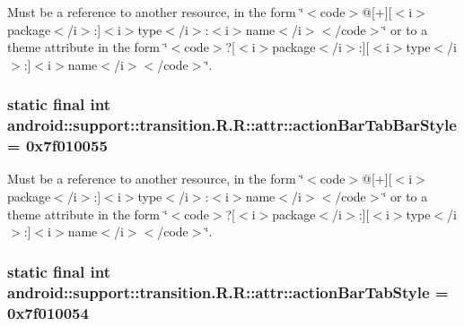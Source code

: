 Must be a reference to another resource, in the form \char`\"{}$<$code$>$@\mbox{[}+\mbox{]}\mbox{[}$<$i$>$package$<$/i$>$:\mbox{]}$<$i$>$type$<$/i$>$:$<$i$>$name$<$/i$>$$<$/code$>$\char`\"{} or to a theme attribute in the form \char`\"{}$<$code$>$?\mbox{[}$<$i$>$package$<$/i$>$:\mbox{]}\mbox{[}$<$i$>$type$<$/i$>$:\mbox{]}$<$i$>$name$<$/i$>$$<$/code$>$\char`\"{}. \hypertarget{classandroid_1_1support_1_1transition_1_1_r_1_1attr_6341d6c682dd48d3ac25faf8b4751851}{
\subsubsection[{actionBarTabBarStyle}]{\setlength{\rightskip}{0pt plus 5cm}static final int android::support::transition.R.R::attr::actionBarTabBarStyle = 0x7f010055}}
\label{classandroid_1_1support_1_1transition_1_1_r_1_1attr_6341d6c682dd48d3ac25faf8b4751851}


Must be a reference to another resource, in the form \char`\"{}$<$code$>$@\mbox{[}+\mbox{]}\mbox{[}$<$i$>$package$<$/i$>$:\mbox{]}$<$i$>$type$<$/i$>$:$<$i$>$name$<$/i$>$$<$/code$>$\char`\"{} or to a theme attribute in the form \char`\"{}$<$code$>$?\mbox{[}$<$i$>$package$<$/i$>$:\mbox{]}\mbox{[}$<$i$>$type$<$/i$>$:\mbox{]}$<$i$>$name$<$/i$>$$<$/code$>$\char`\"{}. \hypertarget{classandroid_1_1support_1_1transition_1_1_r_1_1attr_d6b683522d86dcb50798112fe4e71350}{
\subsubsection[{actionBarTabStyle}]{\setlength{\rightskip}{0pt plus 5cm}static final int android::support::transition.R.R::attr::actionBarTabStyle = 0x7f010054}}
\label{classandroid_1_1support_1_1transition_1_1_r_1_1attr_d6b683522d86dcb50798112fe4e71350}


